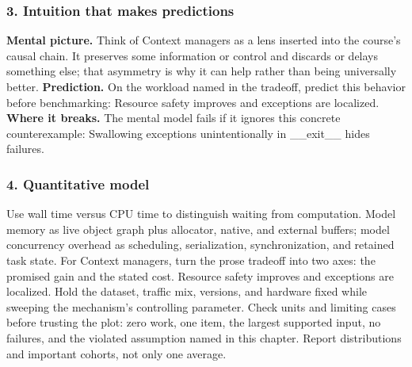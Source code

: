 \subsubsection*{3. Intuition that makes predictions}
\textbf{Mental picture.} Think of Context managers as a lens inserted into the course's causal chain. It preserves some information or control and discards or delays something else; that asymmetry is why it can help rather than being universally better.
\textbf{Prediction.} On the workload named in the tradeoff, predict this behavior before benchmarking: Resource safety improves and exceptions are localized.
\textbf{Where it breaks.} The mental model fails if it ignores this concrete counterexample: Swallowing exceptions unintentionally in \_\_exit\_\_ hides failures.
\subsubsection*{4. Quantitative model}
Use wall time versus CPU time to distinguish waiting from computation. Model memory as live object graph plus allocator, native, and external buffers; model concurrency overhead as scheduling, serialization, synchronization, and retained task state.
For Context managers, turn the prose tradeoff into two axes: the promised gain and the stated cost. Resource safety improves and exceptions are localized. Hold the dataset, traffic mix, versions, and hardware fixed while sweeping the mechanism's controlling parameter.
Check units and limiting cases before trusting the plot: zero work, one item, the largest supported input, no failures, and the violated assumption named in this chapter. Report distributions and important cohorts, not only one average.
